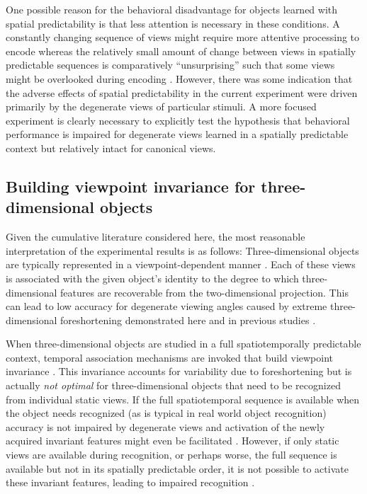 \documentclass[dwyatte_dissertation.tex]{subfiles}
\begin{document}
One possible reason for the behavioral disadvantage for objects learned with spatial predictability is that less attention is necessary in these conditions. A constantly changing sequence of views might require more attentive processing to encode whereas the relatively small amount of change between views in spatially predictable sequences is comparatively ``unsurprising'' such that some views might be overlooked during encoding \cite{TarrGauthier98}. However, there was some indication that the adverse effects of spatial predictability in the current experiment were driven primarily by the degenerate views of particular stimuli. A more focused experiment is clearly necessary to explicitly test the hypothesis that behavioral performance is impaired for degenerate views learned in a spatially predictable context but relatively intact for canonical views. 

\subsection{Building viewpoint invariance for three-dimensional objects}
Given the cumulative literature considered here, the most reasonable interpretation of the experimental results is as follows: Three-dimensional objects are typically represented in a viewpoint-dependent manner \cite{WallisBulthoff99,EdelmanBulthoff92,TarrGauthier98,LogothetisPaulsBulthoffEtAl94,LogothetisPaulsPoggio95}. Each of these views is associated with the given object's identity to the degree to which three-dimensional features are recoverable from the two-dimensional projection. This can lead to low accuracy for degenerate viewing angles caused by extreme three-dimensional foreshortening demonstrated here and in previous studies \cite{BalasSinha09b}. 

When three-dimensional objects are studied in a full spatiotemporally predictable context, temporal association mechanisms are invoked that build viewpoint invariance \cite{CoxMeierOerteltEtAl05,LiDiCarlo08,LiDiCarlo10,LiDiCarlo12}. This invariance accounts for variability due to foreshortening but is actually \textit{not optimal} for three-dimensional objects that need to be recognized from individual static views. If the full spatiotemporal sequence is available when the object needs recognized (as is typical in real world object recognition) accuracy is not impaired by degenerate views and activation of the newly acquired invariant features might even be facilitated \cite{BalasSinha09c}. However, if only static views are available during recognition, or perhaps worse, the full sequence is available but not in its spatially predictable order, it is not possible to activate these invariant features, leading to impaired recognition \cite{Stone98,VuongTarr04,ChuangVuongBulthoff12}.
\end{document}
